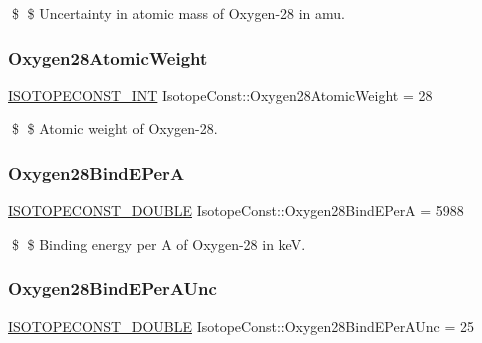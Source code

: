 \$ \$ Uncertainty in atomic mass of Oxygen-\/28 in amu. \mbox{\label{group___isotope_const-_oxygen-_o28_ga3c0b3c956ebaad478eb6d6a5b073a5b1}} 
\subsubsection{\texorpdfstring{Oxygen28\+Atomic\+Weight}{Oxygen28AtomicWeight}}
{\footnotesize\ttfamily \mbox{\hyperlink{group___isotope_const-_macros_ga5f18360b3e99483a35c32d789e62621c}{I\+S\+O\+T\+O\+P\+E\+C\+O\+N\+S\+T\+\_\+\+I\+NT}} Isotope\+Const\+::\+Oxygen28\+Atomic\+Weight = 28}

\$ \$ Atomic weight of Oxygen-\/28. \mbox{\label{group___isotope_const-_oxygen-_o28_ga4a5f8151ae0ea653f82efceddf4ba0ac}} 
\subsubsection{\texorpdfstring{Oxygen28\+Bind\+E\+PerA}{Oxygen28BindEPerA}}
{\footnotesize\ttfamily \mbox{\hyperlink{group___isotope_const-_macros_ga8f45a7272ce02c0b4c65c44636ed719a}{I\+S\+O\+T\+O\+P\+E\+C\+O\+N\+S\+T\+\_\+\+D\+O\+U\+B\+LE}} Isotope\+Const\+::\+Oxygen28\+Bind\+E\+PerA = 5988}

\$ \$ Binding energy per A of Oxygen-\/28 in keV. \mbox{\label{group___isotope_const-_oxygen-_o28_gabc28a75f7285406b055fa9b4b297dd1b}} 
\subsubsection{\texorpdfstring{Oxygen28\+Bind\+E\+Per\+A\+Unc}{Oxygen28BindEPerAUnc}}
{\footnotesize\ttfamily \mbox{\hyperlink{group___isotope_const-_macros_ga8f45a7272ce02c0b4c65c44636ed719a}{I\+S\+O\+T\+O\+P\+E\+C\+O\+N\+S\+T\+\_\+\+D\+O\+U\+B\+LE}} Isotope\+Const\+::\+Oxygen28\+Bind\+E\+Per\+A\+Unc = 25}

